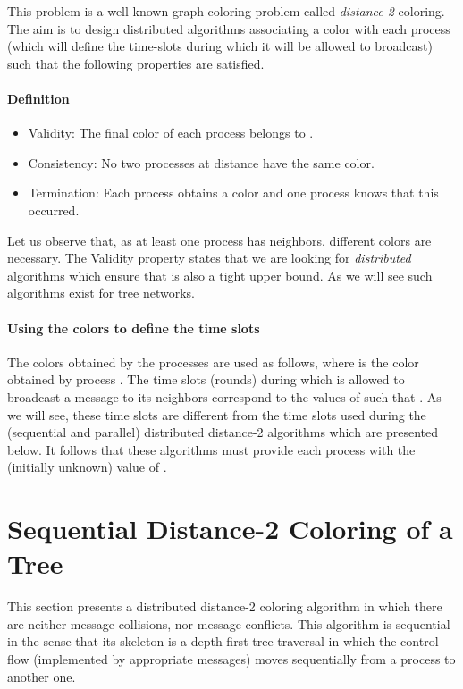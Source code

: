 \documentclass[11pt,english]{article}
\begin{document}
This problem is a well-known graph coloring problem called 
{\it distance-2} coloring. The aim is to design distributed algorithms
associating a color with each process (which will define the 
time-slots during which it  will be allowed to broadcast) such 
that the following properties are satisfied. 


\paragraph{Definition}
\begin{itemize}
\vspace{-0.2cm}
\item Validity: 
The final color of each process belongs to . 
\vspace{-0.2cm}
\item Consistency: 
No two processes at distance  have the same color.  
\vspace{-0.2cm}
\item Termination: Each process obtains a color and one process knows that 
this occurred. 
\end{itemize}
Let us observe that, as at least one process has  neighbors, 
 different  colors are necessary.  The Validity property
states that we are looking for {\it distributed} algorithms which ensure
that  is also a tight upper bound. As we will see such algorithms 
exist for tree networks.  

\paragraph{Using the colors to define the time slots}
The colors obtained by the processes are used as follows, where
 is the color obtained by process .  The time slots
(rounds) during which  is allowed to broadcast a message to its
neighbors correspond to the values of  such that .  As we will see, these time
slots are different from the time slots used during the (sequential
and parallel) distributed distance-2 algorithms which are presented
below. It follows that these algorithms must provide each process with
the (initially unknown) value of .



\section{Sequential Distance-2  Coloring of a Tree}
\label{sec:sequential-d2-tree-algorithm}
This section presents a distributed distance-2 coloring algorithm in
which there are neither message collisions, nor message conflicts.
This algorithm is sequential in the sense that its skeleton is a
depth-first tree traversal in which the control flow (implemented by
appropriate messages) moves sequentially from a process to another one. 
\end{document}
